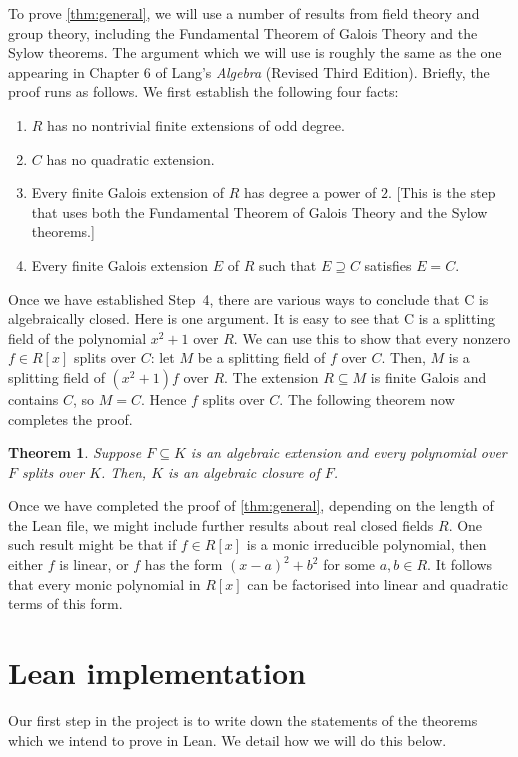 \documentclass{article}
\newtheorem{theorem}{Theorem}
\begin{document}
To prove \cref{thm:general}, we will use a number of results from field theory
and group theory, including the Fundamental Theorem of Galois Theory and the
Sylow theorems. The argument which we will use is roughly the same as the one
appearing in Chapter 6 of Lang's \emph{Algebra} (Revised Third Edition).
Briefly, the proof runs as follows. We first establish the following four facts:
\begin{enumerate}[label=\textbf{Step \arabic*.}, leftmargin=*]
\item $R$ has no nontrivial finite extensions of odd degree.
\item $C$ has no quadratic extension.
\item Every finite Galois extension of $R$ has degree a power of $2$. [This is the step that uses both the Fundamental Theorem of Galois Theory and the Sylow theorems.]
\item Every finite Galois extension $E$ of $R$ such that $E\supseteq C$ satisfies $E=C$.
\end{enumerate}
Once we have established Step~4, there are various ways to conclude that C is
algebraically closed. Here is one argument. It is easy to see that C is a
splitting field of the polynomial $x^2+1$ over $R$. We can use this to show that
every nonzero $f\in R[x]$ splits over $C$: let $M$ be a splitting field of $f$
over $C$. Then, $M$ is a splitting field of $(x^2+1)f$ over $R$. The extension 
$R\subseteq M$ is finite Galois and contains $C$, so $M=C$. Hence $f$ splits
over $C$. The following theorem now completes the proof.
\begin{theorem}
Suppose $F\subseteq K$ is an algebraic extension and every polynomial over $F$
splits over $K$. Then, $K$ is an algebraic closure of $F$.
\end{theorem}

Once we have completed the proof of \cref{thm:general}, depending on the length of the Lean file, we might include further results about real closed fields $R$. One such result might be that if $f\in R[x]$ is a monic irreducible polynomial, then either $f$ is linear, or $f$ has the form $(x-a)^2+b^2$ for some $a,b\in R$. It follows that every monic polynomial in $R[x]$ can be factorised into linear and quadratic terms of this form.

\section*{Lean implementation}

Our first step in the project is to write down the statements of the theorems which we intend to prove in Lean. We detail how we will do this below.
\end{document}
